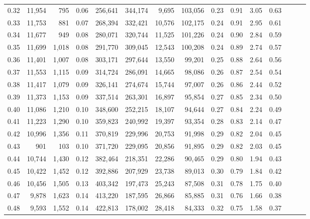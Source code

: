 \begin{tabular}{rrrrrrrrrrrrrrr}
0.32 &  11,954 &    795 &  0.06 &  256,641 &  344,174 &    9,695 &  103,056 &  0.23 &  0.91 &  3.05 &      0.63 \\
0.33 &  11,753 &    881 &  0.07 &  268,394 &  332,421 &   10,576 &  102,175 &  0.24 &  0.91 &  2.95 &      0.61 \\
0.34 &  11,677 &    949 &  0.08 &  280,071 &  320,744 &   11,525 &  101,226 &  0.24 &  0.90 &  2.84 &      0.59 \\
0.35 &  11,699 &  1,018 &  0.08 &  291,770 &  309,045 &   12,543 &  100,208 &  0.24 &  0.89 &  2.74 &      0.57 \\
0.36 &  11,401 &  1,007 &  0.08 &  303,171 &  297,644 &   13,550 &   99,201 &  0.25 &  0.88 &  2.64 &      0.56 \\
0.37 &  11,553 &  1,115 &  0.09 &  314,724 &  286,091 &   14,665 &   98,086 &  0.26 &  0.87 &  2.54 &      0.54 \\
0.38 &  11,417 &  1,079 &  0.09 &  326,141 &  274,674 &   15,744 &   97,007 &  0.26 &  0.86 &  2.44 &      0.52 \\
0.39 &  11,373 &  1,153 &  0.09 &  337,514 &  263,301 &   16,897 &   95,854 &  0.27 &  0.85 &  2.34 &      0.50 \\
0.40 &  11,086 &  1,210 &  0.10 &  348,600 &  252,215 &   18,107 &   94,644 &  0.27 &  0.84 &  2.24 &      0.49 \\
0.41 &  11,223 &  1,290 &  0.10 &  359,823 &  240,992 &   19,397 &   93,354 &  0.28 &  0.83 &  2.14 &      0.47 \\
0.42 &  10,996 &  1,356 &  0.11 &  370,819 &  229,996 &   20,753 &   91,998 &  0.29 &  0.82 &  2.04 &      0.45 \\
0.43 &     901 &    103 &  0.10 &  371,720 &  229,095 &   20,856 &   91,895 &  0.29 &  0.82 &  2.03 &      0.45 \\
0.44 &  10,744 &  1,430 &  0.12 &  382,464 &  218,351 &   22,286 &   90,465 &  0.29 &  0.80 &  1.94 &      0.43 \\
0.45 &  10,422 &  1,452 &  0.12 &  392,886 &  207,929 &   23,738 &   89,013 &  0.30 &  0.79 &  1.84 &      0.42 \\
0.46 &  10,456 &  1,505 &  0.13 &  403,342 &  197,473 &   25,243 &   87,508 &  0.31 &  0.78 &  1.75 &      0.40 \\
0.47 &   9,878 &  1,623 &  0.14 &  413,220 &  187,595 &   26,866 &   85,885 &  0.31 &  0.76 &  1.66 &      0.38 \\
0.48 &   9,593 &  1,552 &  0.14 &  422,813 &  178,002 &   28,418 &   84,333 &  0.32 &  0.75 &  1.58 &      0.37 \\

\end{tabular}
